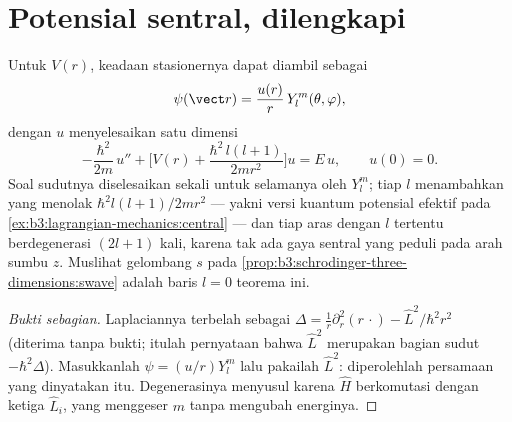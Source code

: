 \section{Potensial sentral, dilengkapi}

\begin{theorem}\label{thm:b3:quantum-angular-momentum:radial}
Untuk $V(r)$, keadaan stasionernya dapat diambil sebagai
\[
\psi(\vect r) = \frac{u(r)}{r}\,Y_l^m(\theta, \varphi) ,
\]
dengan $u$ menyelesaikan  satu dimensi
\[
-\frac{\hbar^2}{2m}\,u'' + \Big[V(r) +
\frac{\hbar^2\,l(l+1)}{2mr^2}\Big]u = E\,u , \qquad u(0) = 0 .
\]
Soal sudutnya diselesaikan sekali untuk selamanya oleh $Y_l^m$; tiap
$l$ menambahkan \emph{} yang menolak
$\hbar^2l(l+1)/2mr^2$ --- yakni versi kuantum potensial efektif pada
\cref{ex:b3:lagrangian-mechanics:central} --- dan tiap aras dengan $l$
tertentu berdegenerasi $(2l+1)$ kali, karena tak ada gaya sentral yang
peduli pada arah sumbu $z$. Muslihat gelombang $s$ pada
\cref{prop:b3:schrodinger-three-dimensions:swave} adalah baris
$l = 0$ teorema ini.
\end{theorem}

\begin{proof}[Bukti sebagian]
Laplaciannya terbelah sebagai $\Delta = \tfrac1r\partial_r^2(r\,\cdot) -
\hat L^2/\hbar^2r^2$ (diterima tanpa bukti; itulah pernyataan bahwa
$\hat L^2$ merupakan bagian sudut $-\hbar^2\Delta$). Masukkanlah
$\psi = (u/r)Y_l^m$ lalu pakailah  $\hat L^2$: diperolehlah
persamaan yang dinyatakan itu. Degenerasinya menyusul karena $\hat H$
berkomutasi dengan ketiga $\hat
L_i$, yang  menggeser
$m$ tanpa mengubah energinya.
\end{proof}

